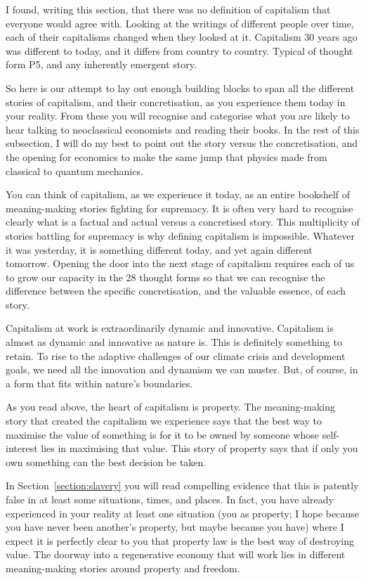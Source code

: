 I found, writing this section, that there was no definition of capitalism that everyone would agree with. Looking at the writings of different people over time, each of their capitalisms changed when they looked at it. Capitalism 30 years ago was different to today, and it differs from country to country. Typical of thought form P5, and any inherently emergent story. 


So here is our attempt to lay out enough building blocks to span all the different stories of capitalism, and their concretisation, as you experience them today in your reality. From these you will recognise and categorise what you are likely to hear talking to neoclassical economists and reading their books. In the rest of this subsection, I will do my best to point out the story versus the concretisation, and the opening for economics to make the same jump that physics made from classical to quantum mechanics.


You can think of capitalism, as we experience it today, as an entire bookshelf of meaning\hyp{}making stories fighting for supremacy. It is often very hard to recognise clearly what is a factual and actual versus a concretised story. This multiplicity of stories battling for supremacy is why defining capitalism is impossible. Whatever it was yesterday, it is something different today, and yet again different tomorrow. Opening the door into the next stage of capitalism requires each of us to grow our capacity in the 28 thought forms so that we can recognise the difference between the specific concretisation, and the valuable essence, of each story.


Capitalism at work is extraordinarily dynamic and innovative. Capitalism is almost as dynamic and innovative as nature is. This is definitely something to retain. To rise to the adaptive challenges of our climate crisis and development goals, we need all the innovation and dynamism we can muster. But, of course, in a form that fits within nature's boundaries.


As you read above, the heart of capitalism is property. The meaning\hyp{}making story that created the capitalism we experience says that the best way to maximise the value of something is for it to be owned by someone whose self-interest lies in maximising that value. This story of property says that if only you own something can the best decision be taken.


In Section~\ref{section:slavery} you will read compelling evidence that this is patently false in at least some situations, times, and places. In fact, you have already experienced in your reality at least one situation (you as property; I hope because you have never been another’s property, but maybe because you have) where I expect it is perfectly clear to you that property law is the best way of destroying value. The doorway into a regenerative economy that will work lies in different meaning\hyp{}making stories around property and freedom. 


